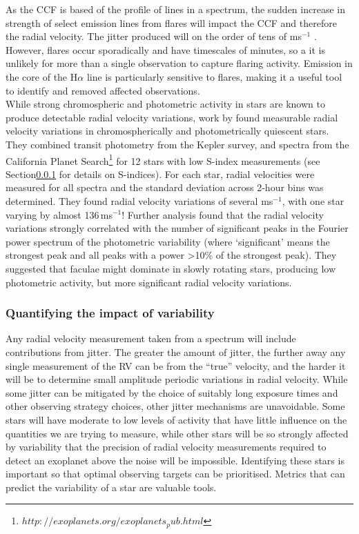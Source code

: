 As the CCF is based of the profile of lines in a spectrum, the sudden increase in strength of select emission lines from flares will impact the CCF and therefore the radial velocity. The jitter produced will on the order of tens of ms$^{-1}$ \citep{2009Reiners}. However, flares occur sporadically and have timescales of minutes, so a it is unlikely for more than a single observation to capture flaring activity. Emission in the core of the H$\alpha$ line is particularly sensitive to flares, making it a useful tool to identify and removed affected observations.\\

While strong chromospheric and photometric activity in stars are known to produce detectable radial velocity variations, work by \citealt{2014Bastien} found measurable radial velocity variations in chromospherically and photometrically quiescent stars. They combined transit photometry from the Kepler survey, and spectra from the California Planet Search\footnote{$http://exoplanets.org/exoplanets_pub.html$} for 12 stars with low S-index measurements (see Section\ref{secVarQuant} for details on S-indices). For each star, radial velocities were measured for all spectra and the standard deviation across 2-hour bins was determined. They found radial velocity variations of several ms$^{-1}$, with one star varying by almost 136\,ms$^{-1}$! Further analysis found that the radial velocity variations strongly correlated with the number of significant peaks in the Fourier power spectrum of the photometric variability (where `significant' means the strongest peak and all peaks with a power \textgreater10\% of the strongest peak). They suggested that faculae might dominate in slowly rotating stars, producing low photometric activity, but more significant radial velocity variations.
\subsubsection{Quantifying the impact of variability}
\label{secVarQuant}
Any radial velocity measurement taken from a spectrum will include contributions from jitter. The greater the amount of jitter, the further away any single measurement of the RV can be from the ``true'' velocity, and the harder it will be to determine small amplitude periodic variations in radial velocity. While some jitter can be mitigated by the choice of suitably long exposure times and other observing strategy choices, other jitter mechanisms are unavoidable. Some stars will have moderate to low levels of activity that have little influence on the quantities we are trying to measure, while other stars will be so strongly affected by variability that the precision of radial velocity measurements required to detect an exoplanet above the noise will be impossible. Identifying these stars is important so that optimal observing targets can be prioritised. Metrics that can predict the variability of a star are valuable tools. \\

